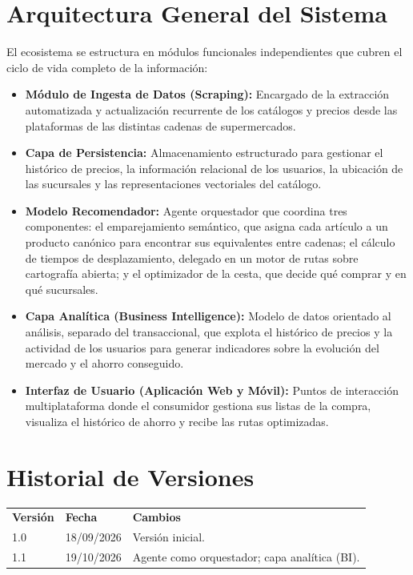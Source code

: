\documentclass[11pt,a4paper]{article}
\begin{document}
	\section{Arquitectura General del Sistema}
	El ecosistema se estructura en módulos funcionales independientes que cubren el ciclo de vida completo de la información:
	\begin{itemize}[noitemsep]
		\item \textbf{Módulo de Ingesta de Datos (Scraping):} Encargado de la extracción automatizada y actualización recurrente de los catálogos y precios desde las plataformas de las distintas cadenas de supermercados.
		\item \textbf{Capa de Persistencia:} Almacenamiento estructurado para gestionar el histórico de precios, la información relacional de los usuarios, la ubicación de las sucursales y las representaciones vectoriales del catálogo.
		\item \textbf{Modelo Recomendador:} Agente orquestador que coordina tres componentes: el emparejamiento semántico, que asigna cada artículo a un producto canónico para encontrar sus equivalentes entre cadenas; el cálculo de tiempos de desplazamiento, delegado en un motor de rutas sobre cartografía abierta; y el optimizador de la cesta, que decide qué comprar y en qué sucursales.
		\item \textbf{Capa Analítica (Business Intelligence):} Modelo de datos orientado al análisis, separado del transaccional, que explota el histórico de precios y la actividad de los usuarios para generar indicadores sobre la evolución del mercado y el ahorro conseguido.
		\item \textbf{Interfaz de Usuario (Aplicación Web y Móvil):} Puntos de interacción multiplataforma donde el consumidor gestiona sus listas de la compra, visualiza el histórico de ahorro y recibe las rutas optimizadas.
	\end{itemize}

	\section*{Historial de Versiones}
	\begin{tabular}{@{}lll@{}}
		\textbf{Versión} & \textbf{Fecha} & \textbf{Cambios} \\
		1.0 & 18/09/2026 & Versión inicial. \\
		1.1 & 19/10/2026 & Agente como orquestador; capa analítica (BI). \\
	\end{tabular}
\end{document}
